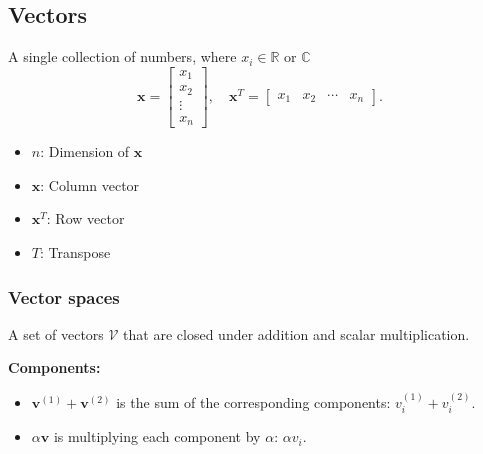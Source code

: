 \subsection{Vectors}
\begin{definition}
    A single collection of numbers, where \( x_i \in \mathbb{R}\) or \(\mathbb{C}\)
    \begin{equation*}
        \mathbf{x} = \begin{bmatrix}
            x_1 \\
            x_2 \\
            \vdots \\
            x_n
        \end{bmatrix}, \quad 
        \mathbf{x}^T = \begin{bmatrix}
            x_1 & x_2 & \cdots & x_n
        \end{bmatrix}.
    \end{equation*}
    
    \begin{itemize}
        \item $n$: Dimension of $\mathbf{x}$
        \item $\mathbf{x}$: Column vector
        \item $\mathbf{x}^T$: Row vector
        \item $T$: Transpose
    \end{itemize}
\end{definition}

\subsubsection{Vector spaces}
\begin{definition}
    A set of vectors \(\mathcal{V}\) that are closed under addition and scalar multiplication.
    \vspace{1em}

    \textbf{Components:}
    \begin{itemize}
        \item $\mathbf{v}^{(1)}+\mathbf{v}^{(2)}$ is the sum of the corresponding components: $v_{i}^{(1)}+v_{i}^{(2)}$.
        \item $\alpha \mathbf{v}$ is multiplying each component by $\alpha$: $\alpha v_{i}$.
    \end{itemize}

\end{definition}


